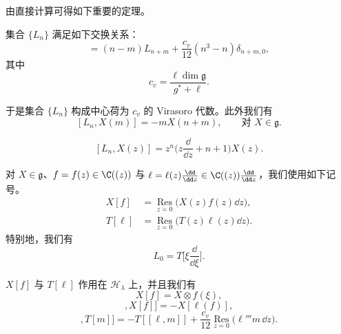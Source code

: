 由直接计算可得如下重要的定理。

\begin{theorem}[2.11]
集合 $\{L_n\}$ 满足如下交换关系：
\begin{equation}
[L_n,L_m]=(n-m)L_{n+m}+\frac{c_v}{12}(n^{3}-n)\delta_{n+m,0}, \tag{2.16}
\end{equation}
其中
\begin{equation}
c_v=\frac{\ell\dim\mathfrak{g}}{g^*+\ell}. \tag{2.17}
\end{equation}
\end{theorem}


于是集合 $\{L_n\}$ 构成中心荷为 $c_v$ 的 Virasoro 代数。此外我们有
\[
[L_n,X(m)]=-mX(n+m),\qquad \text{对 } X\in\mathfrak{g}.
\]

\begin{corollary}[2.12]
\[
[L_n,X(z)]=z^{n}\Big(z\frac{\dd}{\dd z}+n+1\Big)X(z).
\]
\end{corollary}

对 $X\in\mathfrak{g}$、$f=f(z)\in\C((z))$ 与
$\ell=\ell(z)\frac{\dd}{\dd z}\in\C((z))\frac{\dd}{\dd z}$，我们使用如下记号。
\begin{align*}
X[f]&=\operatorname*{Res}_{z=0}\big(X(z)f(z)\dd z\big),\\
T[\ell]&=\operatorname*{Res}_{z=0}\big(T(z)\ell(z)\dd z\big).
\end{align*}
特别地，我们有
\begin{equation}
L_0=T\Big[\xi\frac{\dd}{\dd\xi}\Big]. \tag{2.18}
\end{equation}

\begin{lemma}[2.13]
$X[f]$ 与 $T[\ell]$ 作用在 $\mathcal{H}_{\lambda}$ 上，并且我们有
\[
X[f]=X\otimes f(\xi),
\]
\begin{equation}
[T[\ell],X[f]]=-X[\ell(f)], \tag{2.19}
\end{equation}
\begin{equation}
[T[\ell],T[m]]=-T[[\ell,m]]+\frac{c_v}{12}\operatorname*{Res}_{z=0}\big(\ell'''m\,\dd z\big). \tag{2.20}
\end{equation}
\end{lemma}

